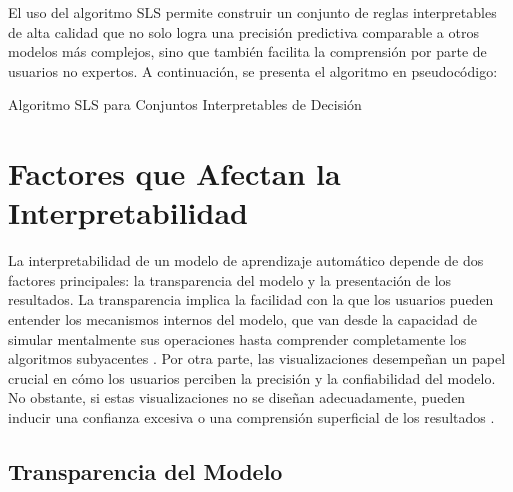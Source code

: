 El uso del algoritmo SLS permite construir un conjunto de reglas interpretables de alta calidad que no solo logra una precisión predictiva comparable a otros modelos más complejos, sino que también facilita la comprensión por parte de usuarios no expertos. A continuación, se presenta el algoritmo en pseudocódigo:

\begin{algorithm}[H]
\caption{Algoritmo SLS para Conjuntos Interpretables de Decisión}
\SetAlgoLined
{}
\BlankLine
{}
\end{algorithm}

\section{Factores que Afectan la Interpretabilidad}

La interpretabilidad de un modelo de aprendizaje automático depende de dos factores principales: la transparencia del modelo y la presentación de los resultados. La transparencia implica la facilidad con la que los usuarios pueden entender los mecanismos internos del modelo, que van desde la capacidad de simular mentalmente sus operaciones hasta comprender completamente los algoritmos subyacentes \cite{Rudin-2019}. Por otra parte, las visualizaciones desempeñan un papel crucial en cómo los usuarios perciben la precisión y la confiabilidad del modelo. No obstante, si estas visualizaciones no se diseñan adecuadamente, pueden inducir una confianza excesiva o una comprensión superficial de los resultados \cite{samek-2019}.

\subsection{Transparencia del Modelo}

